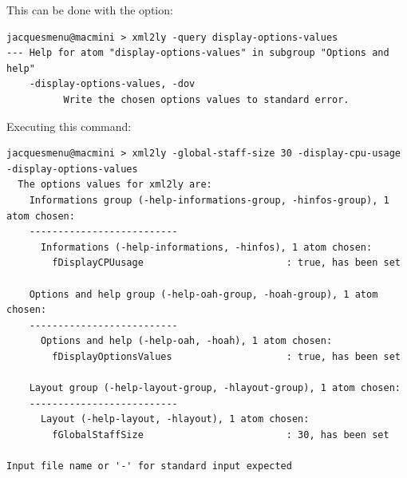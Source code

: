 This can be done with the  option:
\begin{lstlisting}[language=Terminal]
jacquesmenu@macmini > xml2ly -query display-options-values
--- Help for atom "display-options-values" in subgroup "Options and help"
    -display-options-values, -dov
          Write the chosen options values to standard error.
\end{lstlisting}

Executing this command:
\begin{lstlisting}[language=Terminal]
jacquesmenu@macmini > xml2ly -global-staff-size 30 -display-cpu-usage -display-options-values
  The options values for xml2ly are:
    Informations group (-help-informations-group, -hinfos-group), 1 atom chosen:
    --------------------------
      Informations (-help-informations, -hinfos), 1 atom chosen:
        fDisplayCPUusage                         : true, has been set

    Options and help group (-help-oah-group, -hoah-group), 1 atom chosen:
    --------------------------
      Options and help (-help-oah, -hoah), 1 atom chosen:
        fDisplayOptionsValues                    : true, has been set

    Layout group (-help-layout-group, -hlayout-group), 1 atom chosen:
    --------------------------
      Layout (-help-layout, -hlayout), 1 atom chosen:
        fGlobalStaffSize                         : 30, has been set

Input file name or '-' for standard input expected
\end{lstlisting}

